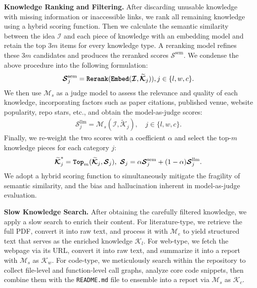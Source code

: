\textbf{Knowledge Ranking and Filtering.}
After discarding unusable knowledge with missing information or inaccessible links, we rank all remaining knowledge using a hybrid scoring function.
Then we calculate the semantic similarity between the idea $\boldsymbol{\mathcal{I}}$ and each piece of knowledge with an embedding model and retain the top $3m$ items for every knowledge type.
A reranking model refines these $3m$ candidates and produces the reranked scores $\boldsymbol{\mathcal{S}}^{\textrm{sem}}$.
We condense the above procedure into the following formulation:
\begin{align}
\label{eqn:semantic_score}
    \boldsymbol{\mathcal{S}}^{\textrm{sem}}_j=\textbf{\texttt{Rerank}}(\textbf{\texttt{Embed}}(\boldsymbol{\mathcal{I}},\boldsymbol{\widetilde{\mathcal{K}}}_j)), j\in\{l,w,c\}.
\end{align}
We then use $\boldsymbol{\mathcal{M}}_s$ as a judge model to assess the relevance and quality of each knowledge, incorporating factors such as paper citations, published venue, website popularity, repo stars, etc., and obtain the model-as-judge scores:
\begin{align}
\label{eqn:llm_score}
    \boldsymbol{\mathcal{S}}^{\textrm{llm}}_j=\boldsymbol{\mathcal{M}}_s(\boldsymbol{\mathcal{I}},\boldsymbol{\widetilde{\mathcal{K}}}_j),\quad j\in\{l,w,c\}.
\end{align}
Finally, we re-weight the two scores with a coefficient $\alpha$ and select the top-$m$ knowledge pieces for each category $j$:
\begin{align}
\label{eqn:hybrid_score}
    \boldsymbol{\widetilde{\mathcal{K}}}^*_j=\textbf{\texttt{Top}}_m(\boldsymbol{\widetilde{\mathcal{K}}}_j, \boldsymbol{\mathcal{S}}_j),\ \boldsymbol{\mathcal{S}}_j=\alpha\boldsymbol{\mathcal{S}}^{\textrm{sem}}_j+(1-\alpha)\boldsymbol{\mathcal{S}}^{\textrm{llm}}_j.
\end{align}
We adopt a hybrid scoring function to simultaneously mitigate the fragility of semantic similarity, and the bias and hallucination inherent in model-as-judge evaluation.

\textbf{Slow Knowledge Search.}
After obtaining the carefully filtered knowledge, we apply a slow search to enrich their content.
For literature-type, we retrieve the full PDF, convert it into raw text, and process it with $\boldsymbol{\mathcal{M}}_e$ to yield structured text that serves as the enriched knowledge $\boldsymbol{\mathcal{K}}_l$.
For web-type, we fetch the webpage via its URL, convert it into raw text, and summarize it into a report with $\boldsymbol{\mathcal{M}}_s$ as $\boldsymbol{\mathcal{K}}_w$.
For code-type, we meticulously search within the repository to collect file-level and function-level call graphs, analyze core code snippets, then combine them with the \texttt{README.md} file to ensemble into a report via $\boldsymbol{\mathcal{M}}_s$ as $\boldsymbol{\mathcal{K}}_c$.

